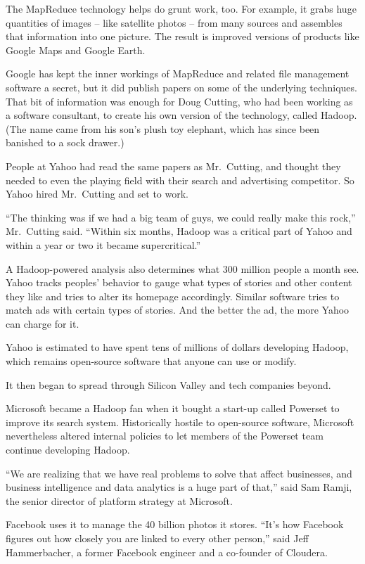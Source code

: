 \documentclass[12pt,a4paper,onecolumn]{article}
\begin{document}
\begin{CJK*}{GBK}{song}
The MapReduce technology helps do grunt work, too. For example, it grabs huge quantities of images
-- like satellite photos -- from many sources and assembles that information into one picture. The
result is improved versions of products like Google Maps and Google Earth.

Google has kept the inner workings of MapReduce and related file management software a secret, but
it did publish papers on some of the underlying techniques. That bit of information was enough for
Doug Cutting, who had been working as a software consultant, to create his own version of the
technology, called Hadoop. (The name came from his son's plush toy elephant, which has since been
banished to a sock drawer.)

People at Yahoo had read the same papers as Mr.~Cutting, and thought they needed to even the playing
field with their search and advertising competitor. So Yahoo hired Mr.~Cutting and set to work.

``The thinking was if we had a big team of guys, we could really make this rock,'' Mr.~Cutting said.
``Within six months, Hadoop was a critical part of Yahoo and within a year or two it became
supercritical.''

A Hadoop-powered analysis also determines what 300 million people a month see. Yahoo tracks peoples'
behavior to gauge what types of stories and other content they like and tries to alter its homepage
accordingly. Similar software tries to match ads with certain types of stories. And the better the
ad, the more Yahoo can charge for it.

Yahoo is estimated to have spent tens of millions of dollars developing Hadoop, which remains
open-source software that anyone can use or modify.

It then began to spread through Silicon Valley and tech companies beyond.

Microsoft became a Hadoop fan when it bought a start-up called Powerset to improve its search
system. Historically hostile to open-source software, Microsoft nevertheless altered internal
policies to let members of the Powerset team continue developing Hadoop.

``We are realizing that we have real problems to solve that affect businesses, and business
intelligence and data analytics is a huge part of that,'' said Sam Ramji, the senior director of
platform strategy at Microsoft.

Facebook uses it to manage the 40 billion photos it stores. ``It's how Facebook figures out how
closely you are linked to every other person,'' said Jeff Hammerbacher, a former Facebook engineer
and a co-founder of Cloudera.


\end{CJK*}
\end{document}

